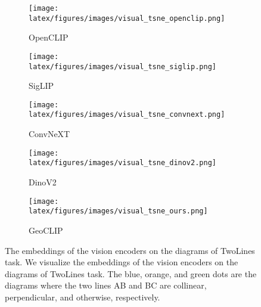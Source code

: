 \begin{figure}[t!]
    \centering
    \begin{subfigure}[t]{.32\linewidth}
        \centering
        \texttt{[image: latex/figures/images/visual\_tsne\_openclip.png]}
        \caption{OpenCLIP}
    \end{subfigure}
    \begin{subfigure}[t]{.32\linewidth}
        \centering
        \texttt{[image: latex/figures/images/visual\_tsne\_siglip.png]}
        \caption{SigLIP}
    \end{subfigure}
    \begin{subfigure}[t]{.32\linewidth}
        \centering
        \texttt{[image: latex/figures/images/visual\_tsne\_convnext.png]}
        \caption{ConvNeXT}
    \end{subfigure}
    \begin{subfigure}[t]{.32\linewidth}
        \centering
        \texttt{[image: latex/figures/images/visual\_tsne\_dinov2.png]}
        \caption{DinoV2}
    \end{subfigure}
    \begin{subfigure}[t]{.32\linewidth}
        \centering
        \texttt{[image: latex/figures/images/visual\_tsne\_ours.png]}
        \caption{GeoCLIP}
    \end{subfigure}
    \caption{
    The embeddings of the vision encoders on the diagrams of TwoLines task. We visualize the embeddings of the vision encoders on the diagrams of TwoLines task. The blue, orange, and green dots are the diagrams where the two lines AB and BC are collinear, perpendicular, and otherwise, respectively.
    \label{fig:tsne_benchmark}
    }
\end{figure}